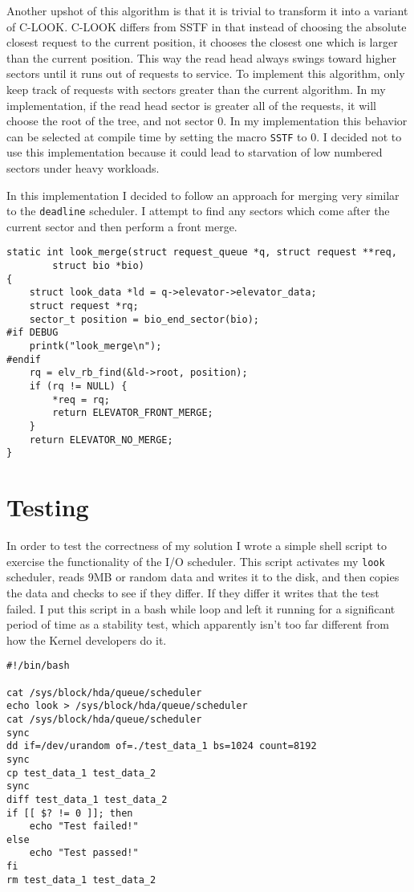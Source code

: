 \documentclass[10pt,conference,draftclsnofoot,onecolumn]{IEEEtran}
\begin{document}
Another upshot of this algorithm is that it is trivial to transform it into a variant of C-LOOK. C-LOOK differs from SSTF in that instead of choosing the absolute closest request to the current position, it chooses the closest one which is larger than the current position. This way the read head always swings toward higher sectors until it runs out of requests to service. To implement this algorithm, only keep track of requests with sectors greater than the current algorithm. In my implementation, if the read head sector is greater all of the requests, it will choose the root of the tree, and not sector 0. In my implementation this behavior can be selected at compile time by setting the macro \texttt{SSTF} to 0. I decided not to use this implementation because it could lead to starvation of low numbered sectors under heavy workloads.

In this implementation I decided to follow an approach for merging very similar to the \texttt{deadline} scheduler. I attempt to find any sectors which come after the current sector and then perform a front merge.

\begin{lstlisting}
static int look_merge(struct request_queue *q, struct request **req,
		struct bio *bio)
{
	struct look_data *ld = q->elevator->elevator_data;
	struct request *rq;
	sector_t position = bio_end_sector(bio);
#if DEBUG
	printk("look_merge\n");
#endif
	rq = elv_rb_find(&ld->root, position);
	if (rq != NULL) {
		*req = rq;
		return ELEVATOR_FRONT_MERGE;
	}
	return ELEVATOR_NO_MERGE;
}
\end{lstlisting}

\section{Testing}
In order to test the correctness of my solution I wrote a simple shell script to exercise the functionality of the I/O scheduler. This script activates my \texttt{look} scheduler, reads 9MB or random data and writes it to the disk, and then copies the data and checks to see if they differ. If they differ it writes that the test failed. I put this script in a bash while loop and left it running for a significant period of time as a stability test, which apparently isn't too far different from how the Kernel developers do it. \cite{lkml}
\begin{lstlisting}
#!/bin/bash

cat /sys/block/hda/queue/scheduler
echo look > /sys/block/hda/queue/scheduler
cat /sys/block/hda/queue/scheduler
sync
dd if=/dev/urandom of=./test_data_1 bs=1024 count=8192
sync
cp test_data_1 test_data_2
sync
diff test_data_1 test_data_2
if [[ $? != 0 ]]; then
	echo "Test failed!"
else
	echo "Test passed!"
fi
rm test_data_1 test_data_2
\end{lstlisting}
\end{document}
